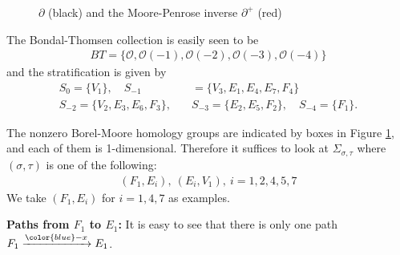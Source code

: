 \documentclass[11pt,reqno]{amsart}
\theoremstyle{definition}
\numberwithin{equation}{section}
\begin{document}
\begin{figure}
\caption{$\partial$ (black) and the Moore-Penrose inverse $\partial^+$ (red)}
\label{fig:MP-inverse}
\end{figure}

The Bondal-Thomsen collection is easily seen to be
\begin{align*}
    BT=\{\mathcal{O},\mathcal{O}(-1),\mathcal{O}(-2),\mathcal{O}(-3),\mathcal{O}(-4)\}
\end{align*}
and the stratification is given by
\begin{align*}
    S_0=\{V_1\},\quad S_{-1}&=\{V_3,E_1,E_4,E_7, F_4\} \\
    S_{-2} = \{V_2, E_3, E_6, F_3\},\quad &S_{-3} = \{E_2, E_5, F_2\},\quad S_{-4} = \{F_1\}.
\end{align*}





The nonzero Borel-Moore homology groups are indicated by boxes in Figure \ref{fig:MP-inverse}, and each of them is 1-dimensional. Therefore it suffices to look at $\Sigma_{\sigma,\tau}$ where $(\sigma,\tau)$ is one of the following:
\begin{align*}
    (F_1, E_i),\ (E_i, V_1),\ i=1,2,4,5,7
\end{align*}
We take $(F_1, E_i)$ for $i=1,4,7$ as examples.

\smallskip

{\bf Paths from $F_1$ to $E_1$:} It is easy to see that there is only one path $F_1 \xrightarrow{\color{blue} -x}E_1$.

\smallskip
\end{document}
